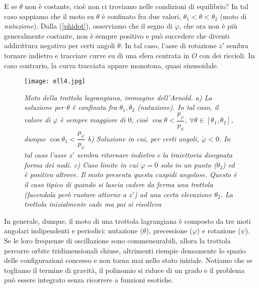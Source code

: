 \documentclass[a4paper,openany]{article}
\begin{document}
	E se $\theta$ non è costante, cioè non ci troviamo nelle condizioni di equilibrio? In tal caso sappiamo che il moto su $\theta$ è confinato fra due valori, $\theta_1<\theta <\theta_2$ (moto di \textit{nutazione}). Dalla (\ref{phidot}), osserviamo che il segno di $\dot{\varphi}$, che ora non è più generalmente costante, non è sempre positivo e può succedere che diventi addirittura negativo per certi angoli $\theta$. In tal caso, l'asse di rotazione $z'$ sembra tornare indietro e tracciare curve su di una sfera centrata in $O$ con dei riccioli. In caso contrario, la curva tracciata appare monotona, quasi sinusoidale. 
	\begin{figure}[H]
		\centering
		\texttt{[image: ell4.jpg]}
		\caption{\textit{Moto della trottola lagrangiana, immagine dell'Arnold. a) La soluzione per $\theta$ è confinata fra $\theta_1,\theta_2$ (nutazione). In tal caso, il valore di $\varphi$ è sempre maggiore di $0$, cioè $\cos\theta < \dfrac{p_{\varphi}}{p_\psi}$, $\forall\theta\in[\theta_1,\theta_2]$, dunque $\cos\theta_1 < \dfrac{p_{\varphi}}{p_\psi}$ b) Soluzione in cui, per certi angoli, $\dot{\varphi}<0$. In tal caso l'asse $z'$ sembra ritornare indietro e la traiettoria disegnata forma dei nodi. c) Caso limite in cui $\dot{\varphi}=0$ solo in un punto ($\theta_2$) ed è positiva altrove. Il moto presenta questa cuspidi angolose. Questo è il caso tipico di quando si lascia cadere da ferma una trottola (facendola però ruotare attorno a $z'$) ad una certa elevazione $\theta_2$. La trottola inizialmente cade ma poi si risolleva}}
	\end{figure}
	In generale, dunque, il moto di una trottola lagrangiana è composto da tre moti angolari indipendenti e periodici: nutazione ($\theta$), precessione ($\varphi$) e rotazione ($\psi$). Se le loro frequenze di oscillazione sono commensurabili, allora la trottola percorre orbite tridimensionali chiuse, altrimenti riempie densamente lo spazio delle configurazioni concesso e non torna mai nello stato iniziale.
	Notiamo che se togliamo il termine di gravità, il polinomio si riduce di un grado e il problema può essere integrato senza ricorrere a funzioni esotiche. 
\end{document}
